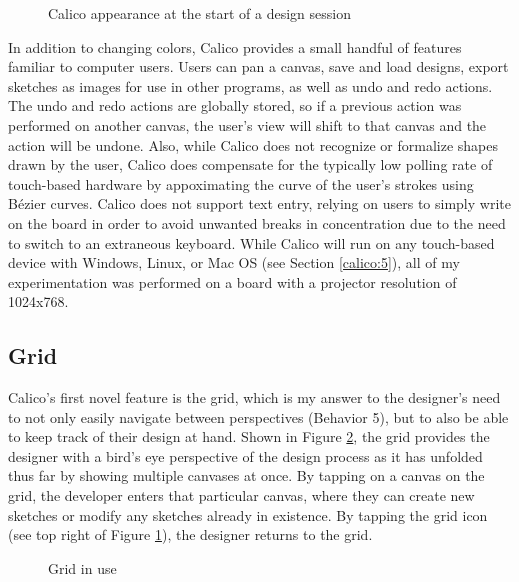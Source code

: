 \begin{figure}
  \centering
  \caption {Calico appearance at the start of a design session}
\label{fig:3}       %
\end{figure}
%

In addition to changing colors, Calico provides a small handful of features familiar to computer users. Users can pan a canvas, save and load designs, export sketches as images for use in other programs, as well as undo and redo actions. The undo and redo actions are globally stored, so if a previous action was performed on another canvas, the user's view will shift to that canvas and the action will be undone. Also, while Calico does not recognize or formalize shapes drawn by the user, Calico does compensate for the typically low polling rate of touch-based hardware by appoximating the curve of the user's strokes using B\'ezier curves. Calico does not support text entry, relying on users to simply write on the board in order to avoid unwanted breaks in concentration due to the need to switch to an extraneous keyboard. While Calico will run on any touch-based device with Windows, Linux, or Mac OS (see Section \ref{calico:5}), all of my experimentation was performed on a board with a projector
 resolution of 1024x768.
 
\subsection{Grid}
\label{calico:2}

Calico's first novel feature is the grid, which is my answer to the designer's need to not only easily navigate between perspectives (Behavior 5), but to also be able to keep track of their design at hand. Shown in Figure \ref{fig:4}, the grid provides the designer with a bird's eye perspective of the design process as it has unfolded thus far by showing multiple canvases at once. By tapping on a canvas on the grid, the developer enters that particular canvas, where they can create new sketches or modify any sketches already in existence. By tapping the grid icon (see top right of Figure \ref{fig:3}), the designer returns to the grid. 

\begin{figure}
 
\caption {Grid in use}
\label{fig:4}       %
\end{figure}
%

